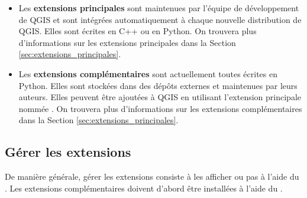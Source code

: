 \begin{itemize}
\item Les \textbf{extensions principales} sont maintenues par l'équipe de développement de QGIS et sont intégrées automatiquement à chaque nouvelle distribution de QGIS.
Elles sont écrites en C++ ou en Python.
On trouvera plus d'informations sur les extensions principales dans la Section \ref{sec:extensions_principales}.
\item Les \textbf{extensions complémentaires} sont actuellement toutes écrites en Python.
Elles sont stockées dans des dépôts externes et maintenues par leurs auteurs.
Elles peuvent être ajoutées à QGIS en utilisant l'extension principale nommée .
On trouvera plus d'informations sur les extensions complémentaires dans la Section \ref{sec:extensions_principales}.
\end{itemize}

%

\subsection{Gérer les extensions}\label{sec:managing_plugins}

De manière générale, gérer les extensions consiste à les afficher ou pas à l'aide du .
Les extensions complémentaires doivent d'abord être installées à l'aide du .





